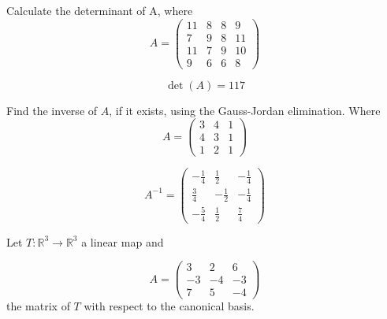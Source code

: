 \begin{questions}

\question Calculate the determinant of A, where
$$
A=\left(\begin{array}{rrrr}
11 & 8 & 8 & 9 \\
7 & 9 & 8 & 11 \\
11 & 7 & 9 & 10 \\
9 & 6 & 6 & 8
\end{array}\right)
$$

\begin{solution}
$$\det(A)=117$$
\end{solution}

\question Find the inverse of $A$, if it exists, using the Gauss-Jordan elimination. Where
$$
A=\left(\begin{array}{rrr}
3 & 4 & 1 \\
4 & 3 & 1 \\
1 & 2 & 1
\end{array}\right)
$$

\begin{solution}
$$A^{-1}=\left(\begin{array}{rrr}
-\frac{1}{4} & \frac{1}{2} & -\frac{1}{4} \\
\frac{3}{4} & -\frac{1}{2} & -\frac{1}{4} \\
-\frac{5}{4} & \frac{1}{2} & \frac{7}{4}
\end{array}\right)$$
\end{solution}

\question Let $T:\mathbb{R}^3\rightarrow\mathbb{R}^3$  a linear map and
 
$$
A=\left(\begin{array}{rrr}
3 & 2 & 6 \\
-3 & -4 & -3 \\
7 & 5 & -4
\end{array}\right)
$$
the matrix of $T$ with respect to the canonical basis.
\end{questions}

